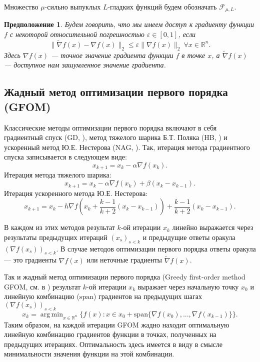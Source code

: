 \documentclass{article}
\DeclareMathOperator*{\argmin}{arg\,min}
\newtheorem{Def}{Определение}[section]
\newtheorem{proposition}{Предположение}
\begin{document}
Множество $\mu$-сильно выпуклых $L$-гладких функций будем обозначать $\mathcal{F}_{\mu, L}$.


\begin{proposition}
    \label{inexact_grad}
Будем говорить, что мы имеем доступ к градиенту функции $f$ с некоторой относительной погрешностью $\varepsilon \in [0, 1]$, если
\begin{equation}\label{eq_relative_error}
    \|\widetilde{\nabla} f(x) - \nabla f(x)\|_2 \leq \varepsilon\|\nabla f(x)\|_2 \ \forall x \in \mathbb{R}^n.
\end{equation}
Здесь $\nabla f(x)$ --- точное значение градиента функции $f$ в точке $x$, а $\widetilde{\nabla} f(x)$ --- доступное нам зашумленное значение градиента.
\end{proposition} 


\subsection{Жадный метод оптимизации первого порядка (GFOM)}



Классические методы оптимизации первого порядка включают в себя градиентный спуск (GD, \cite{cauchy1847methode}), метод тяжелого шарика Б.Т. Поляка (HB, \cite{polyak1963gradient}) и ускоренный метод Ю.Е. Нестерова (NAG, \cite{nesterov1983method}). Так, итерация метода градиентного спуска записывается в следующем виде:
\[x_{k+1}  = x_k - \alpha \nabla f(x_k). \tag{GD}\]
Итерация метода тяжелого шарика:
\[x_{k+1} = x_k - \alpha \nabla f(x_k) + \beta (x_k - x_{k - 1}).\tag{HB}\]
Итерация ускоренного метода Ю.Е. Нестерова:
\[x_{k+1} = x_k - h \nabla f(x_k + \frac{k - 1}{k + 2} (x_k - x_{k-1})) + \frac{k - 1}{k + 2} (x_k - x_{k-1}).\tag{NAG}\]

В каждом из этих методов результат $k$-ой итерации $x_k$ линейно выражается через результаты предыдущих итераций $(x_s)_{s < k}$ и предыдущие ответы оракула $(\nabla f(x_s))_{s < k}$. В случае методов оптимизации первого порядка ответы оракула --- это градиенты $\nabla f(x)$ или неточные градиенты $\widetilde{\nabla} f(x)$.

Так и жадный метод оптимизации первого порядка (Greedy first-order method GFOM, см. в \cite{drori2020efficient}) результат $k$-ой итерации $x_k$ выражает через начальную точку $x_0$ и линейную комбинацию ($\text{span}$) градиентов на предыдущих шагах $(\nabla f(x_s))_{s < k}$
\[x_k = \argmin_{x \in \mathbb{R}^n}\{f(x): x \in x_0 + \text{span}\{\nabla f(x_0), ..., \nabla f(x_{k-1})\}\}. \tag{GFOM}\]
Таким образом, на каждой итерации GFOM жадно находит оптимальную линейную комбинацию градиентов функции в точках, полученных на предыдущих итерациях. Оптимальность здесь имеется в виду в смысле минимальности значения функции на этой комбинации.  
\end{document}
